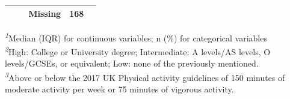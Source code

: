 \documentclass[
]{article}
\begin{document}
\begin{table}[h]
\begin{tabular*}{1\linewidth}{@{\extracolsep{\fill}}lcc}
    Missing & 168 &  \\ 
\bottomrule
\end{tabular*}
\begin{minipage}{\linewidth}
\textsuperscript{\textit{1}}Median (IQR) for continuous variables; n (\%) for categorical variables\\
\textsuperscript{\textit{2}}High: College or University degree;
Intermediate: A levels/AS levels, O levels/GCSEs, or equivalent;
Low: none of the previously mentioned.\\
\textsuperscript{\textit{3}}Above or below the 2017 UK Physical activity guidelines of 150 minutes of moderate activity per week or 75 minutes of vigorous activity.\\
\end{minipage}
\end{table}
\end{document}
